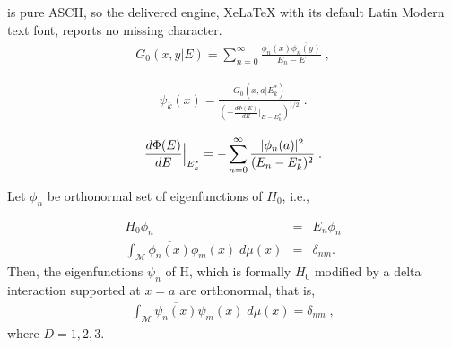 \documentclass[10pt,a4paper]{amsart}
\begin{document}
is pure ASCII, so the delivered engine, XeLaTeX with its default Latin Modern text font, reports no missing character.
\begin{eqnarray}
    G_0(x,y|E) = \sum_{n=0}^{\infty} \frac{\phi_n(x) \overline{\phi_n(y)}}{E_n-E}  \;, \label{greenfuncexpansion}
\end{eqnarray}

\begin{eqnarray}
    \psi_k(x)=  \frac{G_0(x,a|E_{k}^{*})}{ \left(-\frac{d \Phi(E)}{d E}\bigg|_{E=E_{k}^{*}}\right)^{1/2}} \;. \label{boundstatewavefunctionexact}
\end{eqnarray}

\begin{equation}
    {d\Phi(E)\over dE}\Big|_{E_k^*}= - \sum_{n=0}^\infty { |\phi_n(a)|^2\over (E_n-E_k^*)^2} \;. \label{derivativePhi}
\end{equation}

\begin{myproposition} Let $\phi_n$ be orthonormal set of eigenfunctions of $H_0$, i.e., 

\begin{eqnarray}
H_0 \phi_n &=&E_n \phi_n \nonumber \\ \int_{\mathcal{M}} \overline{\phi_n(x)} \phi_m (x) \; d\mu(x) & =&  \delta_{nm}.
\end{eqnarray} 
%
Then, the eigenfunctions $\psi_n$ of H, which is formally $H_0$ modified by a delta interaction supported at $x=a$ are orthonormal, that is, 
%
\begin{eqnarray}
    \int_{\mathcal{M}} \overline{\psi_n(x)} \psi_m (x) \; d\mu( x) = \delta_{nm} \;,
\end{eqnarray}
%
where $D=1,2,3$. \end{myproposition}
\end{document}
